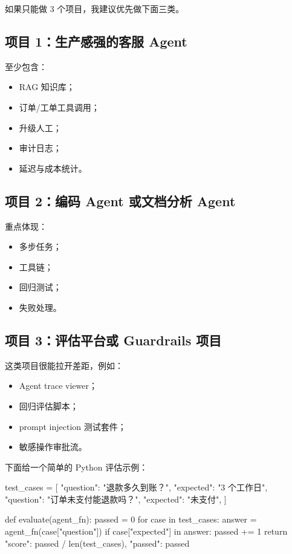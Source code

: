 如果只能做 3 个项目，我建议优先做下面三类。


\subsection{项目 1：生产感强的客服 Agent}

至少包含：


\begin{itemize}[leftmargin=2em]
\item RAG 知识库；
\item 订单/工单工具调用；
\item 升级人工；
\item 审计日志；
\item 延迟与成本统计。
\end{itemize}

\subsection{项目 2：编码 Agent 或文档分析 Agent}

重点体现：


\begin{itemize}[leftmargin=2em]
\item 多步任务；
\item 工具链；
\item 回归测试；
\item 失败处理。
\end{itemize}

\subsection{项目 3：评估平台或 Guardrails 项目}

这类项目很能拉开差距，例如：


\begin{itemize}[leftmargin=2em]
\item Agent trace viewer；
\item 回归评估脚本；
\item prompt injection 测试套件；
\item 敏感操作审批流。
\end{itemize}

下面给一个简单的 Python 评估示例：


\begin{codeblock}
test_cases = [
    {"question": "退款多久到账？", "expected": "3 个工作日"},
    {"question": "订单未支付能退款吗？", "expected": "未支付"},
]


def evaluate(agent_fn):
    passed = 0
    for case in test_cases:
        answer = agent_fn(case["question"])
        if case["expected"] in answer:
            passed += 1
    return {"score": passed / len(test_cases), "passed": passed}
\end{codeblock}

